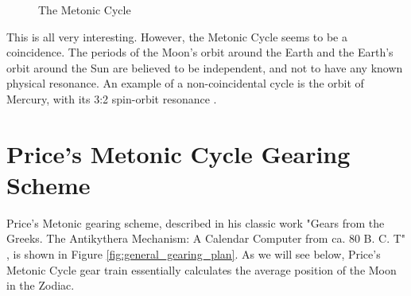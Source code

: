 \documentclass[11pt, oneside]{article}   	%
\theoremstyle{definition}
\begin{document}
\bigskip
\bigskip
\begin{figure}[H]
  \caption{The Metonic Cycle \cite{youtube:freeth2021}}
  \label{fig:metonic_cycle}
\end{figure}

\bigskip
\bigskip
\noindent
This is all very interesting. However, the Metonic Cycle seems to be a coincidence. The periods of the Moon's orbit around the Earth and the Earth's 
orbit around the Sun are believed to be independent, and not to have any known physical resonance. An example of a non-coincidental 
cycle is the orbit of Mercury, with its 3:2 spin-orbit resonance \cite{Correia2004}. 

\section{Price's Metonic Cycle Gearing Scheme}
Price's Metonic gearing scheme, described in his classic work "Gears from the Greeks. The Antikythera Mechanism: A Calendar Computer from 
ca. 80 B. C. T" \cite{gears_from_the_greeks},  is shown in Figure \ref{fig:general_gearing_plan}. As we will see below, Price's Metonic Cycle gear 
train essentially calculates the average position of the Moon in the Zodiac.
\end{document}
